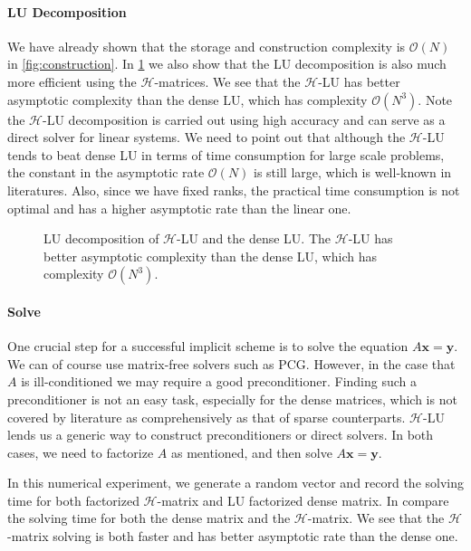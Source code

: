 \documentclass[10pt,a4paper]{article}
\newcommand{\bx}[0]{\mathbf{x}}
\theoremstyle{definition}
\newcommand{\by}[0]{\mathbf{y}}
\begin{document}
\paragraph{LU Decomposition}

We have already shown that the storage and construction complexity is $\mathcal{O}(N)$ in \cref{fig:construction}. In \cref{fig:lu} we also show that the LU decomposition is also much more efficient using the $\mathcal{H}$-matrices. We see that the $\mathcal{H}$-LU has better asymptotic complexity than the dense LU, which has complexity $\mathcal{O}(N^3)$. Note the $\mathcal{H}$-LU decomposition is carried out using high accuracy and can serve as a direct solver for linear systems. We need to point out that although the $\mathcal{H}$-LU tends to beat dense LU in terms of time consumption for large scale problems, the constant in the asymptotic rate $\mathcal{O}(N)$ is still large, which is well-known in literatures. Also, since we have fixed ranks, the practical time consumption is not optimal and has a higher asymptotic rate than the linear one. 

\begin{figure}[htpb]
\centering
\scalebox{0.6}{}
\caption{LU decomposition of $\mathcal{H}$-LU and the dense LU. The $\mathcal{H}$-LU has better asymptotic complexity than the dense LU, which has complexity $\mathcal{O}(N^3)$.}
\label{fig:lu}
\end{figure}



\paragraph{Solve}

One crucial step for a successful implicit scheme is to solve the equation $A\bx=\by$. We can of course use matrix-free solvers such as PCG. However, in the case that $A$ is ill-conditioned we may require a good preconditioner. Finding such a preconditioner is not an easy task, especially for the dense matrices, which is not covered by literature as comprehensively as that of sparse counterparts. $\mathcal{H}$-LU lends us a generic way to construct preconditioners or direct solvers. In both cases, we need to factorize $A$ as mentioned, and then solve $A\bx=\by$. 

In this numerical experiment, we generate a random vector and record the solving time for both factorized $\mathcal{H}$-matrix and LU factorized dense matrix. In  compare the solving time for both the dense matrix and the $\mathcal{H}$-matrix. We see that the $\mathcal{H}$-matrix solving is both faster and has better asymptotic rate than the dense one.
\end{document}
